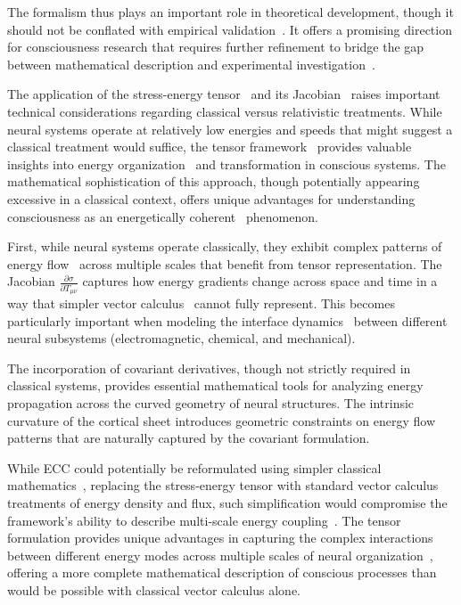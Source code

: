 The formalism thus plays an important role in theoretical development, though it should not be conflated with empirical validation~\cite{goff2019galileo}. It offers a promising direction for consciousness research that requires further refinement to bridge the gap between mathematical description and experimental investigation~\cite{feinberg2016ancient, thompson2010mind}.

The application of the stress-energy tensor~ and its Jacobian~ raises important technical considerations regarding classical versus relativistic treatments. While neural systems operate at relatively low energies and speeds that might suggest a classical treatment would suffice, the tensor framework~ provides valuable insights into energy organization~ and transformation in conscious systems. The mathematical sophistication of this approach, though potentially appearing excessive in a classical context, offers unique advantages for understanding consciousness as an energetically coherent~ phenomenon.

First, while neural systems operate classically, they exhibit complex patterns of energy flow~ across multiple scales that benefit from tensor representation. The Jacobian $\frac{\partial \sigma}{\partial T_{\mu\nu}}$ captures how energy gradients change across space and time in a way that simpler vector calculus~ cannot fully represent. This becomes particularly important when modeling the interface dynamics~ between different neural subsystems (electromagnetic, chemical, and mechanical).

The incorporation of covariant derivatives, though not strictly required in classical systems, provides essential mathematical tools for analyzing energy propagation across the curved geometry of neural structures. The intrinsic curvature of the cortical sheet introduces geometric constraints on energy flow patterns that are naturally captured by the covariant formulation.

While ECC could potentially be reformulated using simpler classical mathematics~\cite{varela2016embodied}, replacing the stress-energy tensor with standard vector calculus treatments of energy density and flux, such simplification would compromise the framework's ability to describe multi-scale energy coupling~\cite{koch2019feeling}. The tensor formulation provides unique advantages in capturing the complex interactions between different energy modes across multiple scales of neural organization~\cite{rovelli2018order}, offering a more complete mathematical description of conscious processes than would be possible with classical vector calculus alone.

